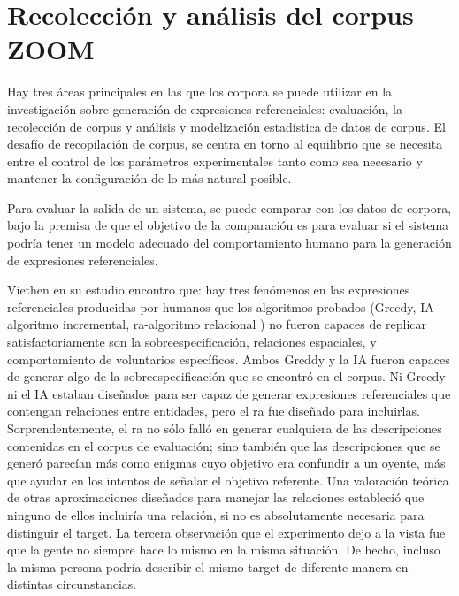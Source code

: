 \chapter{Recolecci\'on y an\'alisis del corpus ZOOM}
\label{sec:corpus}

Hay tres \'areas principales en las que los corpora se puede utilizar en la investigaci\'on sobre generaci\'on de expresiones referenciales:
evaluaci\'on, la recolecci\'on de corpus y an\'alisis y modelizaci\'on estad\'istica de datos de corpus.
El desaf\'io de recopilaci\'on de corpus, se centra en torno al equilibrio que se necesita
entre el control de los par\'ametros experimentales tanto como sea necesario
y mantener la configuraci\'on de lo m\'as natural posible. 

Para evaluar la salida de un sistema, se puede 
comparar con los datos de corpora, bajo la premisa de que el objetivo de la comparaci\'on es
para evaluar si el sistema podr\'ia tener un modelo adecuado del comportamiento humano para la generaci\'on de expresiones referenciales.


Viethen en su estudio encontro que: 
hay tres fen\'omenos en las expresiones referenciales producidas por humanos que los
algoritmos probados (Greedy, IA-algoritmo incremental, ra-algoritmo relacional ) no fueron capaces de replicar satisfactoriamente son la sobreespecificaci\'on,
relaciones espaciales, y comportamiento de voluntarios espec\'ificos. Ambos
Greddy y la IA fueron capaces de generar algo de la sobreespecificaci\'on que se encontr\'o en el corpus.
 Ni Greedy ni el IA estaban dise\~nados para ser capaz de generar expresiones referenciales que contengan relaciones entre entidades, pero el ra fue dise\~nado para incluirlas. Sorprendentemente, el
ra no s\'olo fall\'o en generar cualquiera de las descripciones contenidas en el corpus de evaluaci\'on; sino tambi\'en que las descripciones que se gener\'o parec\'ian m\'as como enigmas cuyo objetivo era confundir a un oyente, m\'as que ayudar en
los intentos de se\~nalar el objetivo referente. 
Una valoraci\'on te\'orica de otras aproximaciones dise\~nados para manejar las relaciones estableci\'o que ninguno de ellos incluir\'ia una relaci\'on, si no es absolutamente necesaria para distinguir el target.
La tercera observaci\'on que el experimento dejo a la vista fue que la gente no siempre hace lo mismo en la misma situaci\'on. De hecho, incluso la misma persona podr\'ia describir el mismo target de diferente manera en distintas
circunstancias. 


